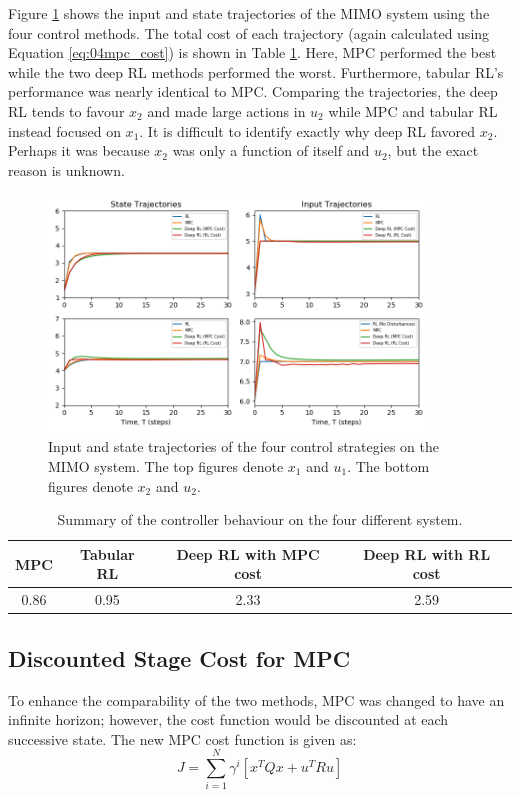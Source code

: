 Figure \ref{fig:04MIMOcomp} shows the input and state trajectories of the MIMO system using the four control methods.  The total cost of each trajectory (again calculated using Equation \ref{eq:04mpc_cost}) is shown in Table \ref{tab:04MIMOCost}. Here, MPC performed the best while the two deep RL methods performed the worst. Furthermore, tabular RL's performance was nearly identical to MPC. Comparing the trajectories, the deep RL tends to favour $x_2$ and made large actions in $u_2$ while MPC and tabular RL instead focused on $x_1$.  It is difficult to identify exactly why deep RL favored $x_2$.
Perhaps it was because $x_2$ was only a function of itself and $u_2$, but the exact reason is unknown.
\begin{figure}[H]
    \centering
    \includegraphics[width=0.9\textwidth]{images/ch4/State_and_Input_MIMO3.png}
    \caption{Input and state trajectories of the four control strategies on the MIMO system. The top figures denote $x_1$ and $u_1$.  The bottom figures denote $x_2$ and $u_2$.}
    \label{fig:04MIMOcomp}
\end{figure}

\begin{table}[H]
\caption{Summary of the controller behaviour on the four different system.}
\label{tab:04MIMOCost}
\centering
\begin{tabular}{c|c|c|c}
\textbf{MPC} & \textbf{Tabular RL} & \textbf{Deep RL with MPC cost}& \textbf{Deep RL with RL cost} \\
\hline
0.86	     & 0.95	               & 2.33                         & 2.59	 \\
\end{tabular}
\end{table}

\subsection{Discounted Stage Cost for MPC}
To enhance the comparability of the two methods, MPC was changed to have an infinite horizon; however, the cost function would be discounted at each successive state.  The new MPC cost function is given as:
\begin{equation}
    J = \sum^{N}_{i = 1} \gamma^i[x^TQx + u^TRu]
    \label{eq:04disc_mpc}
\end{equation}

